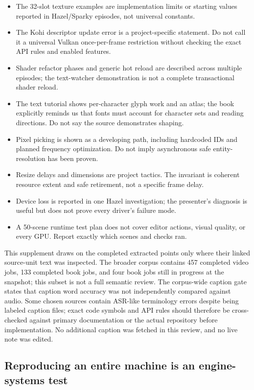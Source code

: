 \begin{itemize}
\tightlist
\item
  The 32-slot texture examples are implementation limits or starting values reported in Hazel/Sparky episodes, not universal constants.
\item
  The Kohi descriptor update error is a project-specific statement. Do not call it a universal Vulkan once-per-frame restriction without checking the exact API rules and enabled features.
\item
  Shader refactor phases and generic hot reload are described across multiple episodes; the text-watcher demonstration is not a complete transactional shader reload.
\item
  The text tutorial shows per-character glyph work and an atlas; the book explicitly reminds us that fonts must account for character sets and reading directions. Do not say the source demonstrates shaping.
\item
  Pixel picking is shown as a developing path, including hardcoded IDs and planned frequency optimization. Do not imply asynchronous safe entity-resolution has been proven.
\item
  Resize delays and dimensions are project tactics. The invariant is coherent resource extent and safe retirement, not a specific frame delay.
\item
  Device loss is reported in one Hazel investigation; the presenter's diagnosis is useful but does not prove every driver's failure mode.
\item
  A 50-scene runtime test plan does not cover editor actions, visual quality, or every GPU. Report exactly which scenes and checks ran.
\end{itemize}

This supplement draws on the completed extracted points only where their linked source-unit text was inspected. The broader corpus contains 457 completed video jobs, 133 completed book jobs, and four book jobs still in progress at the snapshot; this subset is not a full semantic review. The corpus-wide caption gate states that caption word accuracy was not independently compared against audio. Some chosen sources contain ASR-like terminology errors despite being labeled caption files; exact code symbols and API rules should therefore be cross-checked against primary documentation or the actual repository before implementation. No additional caption was fetched in this review, and no live note was edited.

\subsection{Reproducing an entire machine is an engine-systems test}\label{reproducing-an-entire-machine-is-an-engine-systems-test}

